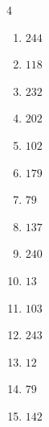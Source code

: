 \begin{multicols}{4}
\begin{enumerate}

  \item $244$


  \item $118$


  \item $232$


  \item $202$


  \item $102$


  \item $179$


  \item $79$


  \item $137$


  \item $240$


  \item $13$


  \item $103$


\columnbreak %

  \item $243$


  \item $12$


  \item $79$


  \item $142$



\end{enumerate}
\end{multicols}
